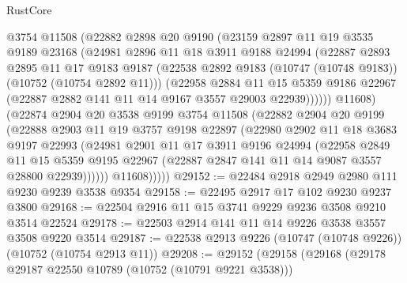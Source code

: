 \begin{lexlean}{RustCore}
\begin{coremodule}
              @3754
              @11508
              (@22882
                @2898
                @20
                @9190
                (@23159
                  @2897
                  @11
                  @19
                  @3535
                  @9189
                  @23168
                  (@24981
                    @2896
                    @11
                    @18
                    @3911
                    @9188
                    @24994
                    (@22887
                      @2893
                      @2895
                      @11
                      @17
                      @9183
                      @9187
                      (@22538 @2892 @9183 (@10747 (@10748 @9183)) (@10752 (@10754 @2892 @11)))
                      (@22958
                        @2884
                        @11
                        @15
                        @5359
                        @9186
                        @22967
                        (@22887 @2882 @141 @11 @14 @9167 @3557 @29003 @22939))))))
              @11608)
            (@22874
              @2904
              @20
              @3538
              @9199
              @3754
              @11508
              (@22882
                @2904
                @20
                @9199
                (@22888
                  @2903
                  @11
                  @19
                  @3757
                  @9198
                  @22897
                  (@22980
                    @2902
                    @11
                    @18
                    @3683
                    @9197
                    @22993
                    (@24981
                      @2901
                      @11
                      @17
                      @3911
                      @9196
                      @24994
                      (@22958
                        @2849
                        @11
                        @15
                        @5359
                        @9195
                        @22967
                        (@22887 @2847 @141 @11 @14 @9087 @3557 @28800 @22939))))))
              @11608)))))
@29152 := @22484 @2918 @2949 @2980 @111 @9230 @9239 @3538 @9354
@29158 := @22495 @2917 @17 @102 @9230 @9237 @3800
@29168 := @22504 @2916 @11 @15 @3741 @9229 @9236 @3508 @9210 @3514 @22524
@29178 := @22503 @2914 @141 @11 @14 @9226 @3538 @3557 @3508 @9220 @3514
@29187 := @22538 @2913 @9226 (@10747 (@10748 @9226)) (@10752 (@10754 @2913 @11))
@29208 := @29152
    (@29158
      (@29168
        (@29178 @29187 @22550 @10789 (@10752 (@10791 @9221 @3538)))

\end{coremodule}
\end{lexlean}
